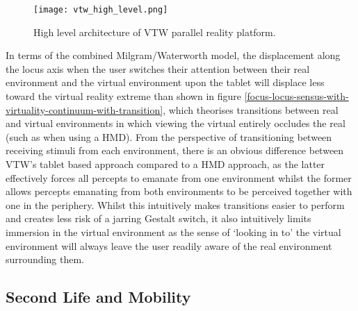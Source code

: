 \begin{figure}[h]
\centering
  \texttt{[image: vtw\_high\_level.png]}
  \caption{High level architecture of VTW parallel reality platform.}
  \label{vtw_high_level.png}
\end{figure}

In terms of the combined Milgram/Waterworth model, the displacement along the locus axis when the user switches their attention between their real environment and the virtual environment upon the tablet will displace less toward the virtual reality extreme than shown in figure \ref{focus-locus-sensus-with-virtuality-continuum-with-transition}, which theorises transitions between real and virtual environments in which viewing the virtual entirely occludes the real (such as when using a HMD). From the perspective of transitioning between receiving stimuli from each environment, there is an obvious difference between VTW's tablet based approach compared to a HMD approach, as the latter effectively forces all percepts to emanate from one environment whilst the former allows percepts emanating from both environments to be perceived together with one in the periphery. Whilst this intuitively makes transitions easier to perform and creates less risk of a jarring Gestalt switch, it also intuitively limits immersion in the virtual environment as the sense of `looking in to' the virtual environment will always leave the user readily aware of the real environment surrounding them.




\subsection{Second Life and Mobility}

\label{SecondLifeMobility}

\newcommand{\LumiyaFootnote}{\footnote{\url{https://play.google.com/store/apps/details?id=com.lumiyaviewer.lumiya&hl=en_GB}}}

